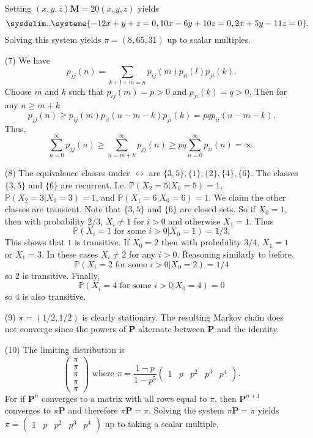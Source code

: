 \documentclass[10pt]{article}
\renewcommand{\P}{\mathbb{P}}
\begin{document}
\begin{enumerate}[(1)]
Setting $(x,y,z)\mathbf M = 20 (x,y,z)$ yields
\[
    \sysdelim.. \systeme{-12x+y+z=0, 10x-6y+10z=0, 2x+5y-11z=0}.
\]
Solving this system yields $\pi=(8, 65, 31)$ up to scalar multiples.

\item[(7)] We have
\[
    p_{jj}(n) = \sum_{k+l+m=n}p_{ij}(m)p_{ii}(l)p_{ji}(k).
\]
Choose $m$ and $k$ such that $p_{ij}(m)=p>0$ and $p_{ji}(k)=q>0$.
Then for any $n\geq m+k$
\[
    p_{jj}(n) \geq p_{ij}(m)p_{ii}(n-m-k)p_{ji}(k)
    = pq p_{ii}(n-m-k).
\]
Thus,
\[
    \sum_{n=0}^\infty p_{jj}(n) \geq \sum_{n=m+k}^\infty p_{jj}(n)
    \geq pq \sum_{n=0}^\infty p_{ii}(n) = \infty.
\]

\item[(8)] The equivalence classes under $\leftrightarrow$ are
$\{3,5\},\{1\},\{2\},\{4\},\{6\}$. The classes $\{3,5\}$ and $\{6\}$
are recurrent. I.e. $\P(X_2=5|X_0=5)=1$, $\P(X_2=3|X_0=3)=1$, and
$\P(X_1=6|X_0=6)=1$. We claim the other classes are transient.
Note that $\{3,5\}$ and $\{6\}$ are closed sets. So if $X_0=1$, then with
probability $2/3$, $X_i\neq 1$ for $i>0$ and otherwise $X_1=1$.
Thus \[
    \P(X_i=1 \text{ for some } i > 0|X_0=1)=1/3.
\]
This shows that $1$ is transitive. If $X_0=2$
then with probability $3/4$, $X_1=1$ or $X_1=3$. In these cases $X_i\neq 2$
for any $i>0$. Reasoning similarly to before,
\[
    \P(X_i=2 \text{ for some } i >0 | X_0=2)=1/4
\]
so $2$ is transitive.
Finally,
\[
    \P(X_i=4 \text{ for some } i > 0 | X_0=4)=0
\]
so $4$ is also transitive.

\item[(9)] $\pi=(1/2,1/2)$ is clearly stationary. The resulting Markov chain
does not converge since the powers of $\mathbf P$ alternate between
$\mathbf P$ and the identity.

\item[(10)] The limiting distribution is
\[
    \begin{pmatrix} \pi \\ \pi \\ \pi \\ \pi \\ \pi \end{pmatrix}
    \text{ where } \pi = \frac{1-p}{1-p^5}
    \begin{pmatrix} 1 & p & p^2 & p^3 & p^4 \end{pmatrix}.
\]
For if $\mathbf P^n$ converges to a matrix with all rows equal to $\pi$,
then $\mathbf P^{n+1}$ converges to $\pi \mathbf P$ and therefore
$\pi \mathbf P = \pi$. Solving the system $\pi \mathbf P = \pi$ yields
$\pi = \begin{pmatrix} 1 & p & p^2 & p^3 & p^4 \end{pmatrix}$ up to
taking a scalar multiple.


\end{enumerate}
\end{document}
